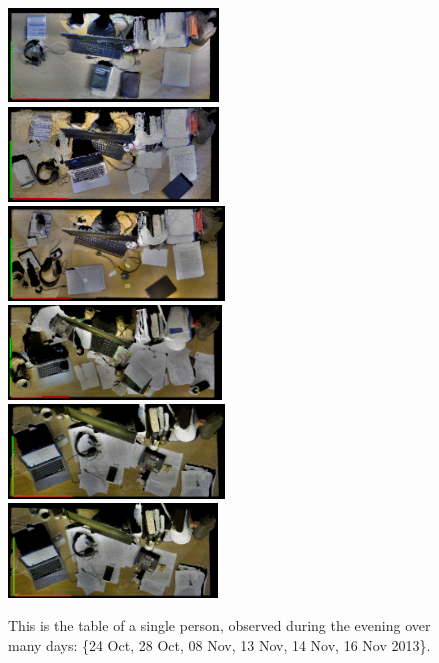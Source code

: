 \documentclass[letterpaper, 10 pt, conference]{ieeeconf}  %
\begin{document}
\begin{figure}[bhtp]
\begin{center}
\includegraphics[height=2.5cm]{131024} \smallskip
\includegraphics[height=2.5cm]{131028} \smallskip
\includegraphics[height=2.5cm]{131108} \\
\includegraphics[height=2.5cm]{131113} \smallskip
\includegraphics[height=2.5cm]{131114} \smallskip
\includegraphics[height=2.5cm]{131116} 
\caption{This is the table of a single person, observed during the evening over many days: \{24 Oct, 28 Oct, 08 Nov, 13 Nov, 14 Nov, 16 Nov 2013\}. }
\label{fig:Variation_Over_Days}
\end{center}
\end{figure}
\end{document}
